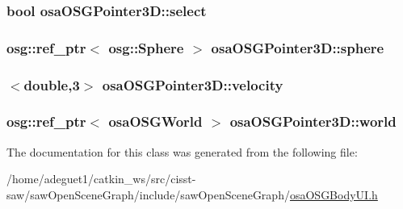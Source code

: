 \hypertarget{classosa_o_s_g_pointer3_d_acd02af84dcccbf5bb89fda754600414d}{
\subsubsection[{select}]{\setlength{\rightskip}{0pt plus 5cm}bool osa\-O\-S\-G\-Pointer3\-D\-::select\hspace{0.3cm}{\ttfamily [protected]}}}\label{classosa_o_s_g_pointer3_d_acd02af84dcccbf5bb89fda754600414d}
\hypertarget{classosa_o_s_g_pointer3_d_a3f2f4ea0fac395d6b6a8cb20af610d9d}{
\subsubsection[{sphere}]{\setlength{\rightskip}{0pt plus 5cm}osg\-::ref\-\_\-ptr$<$ osg\-::\-Sphere $>$ osa\-O\-S\-G\-Pointer3\-D\-::sphere\hspace{0.3cm}{\ttfamily [protected]}}}\label{classosa_o_s_g_pointer3_d_a3f2f4ea0fac395d6b6a8cb20af610d9d}
\hypertarget{classosa_o_s_g_pointer3_d_a9ed8936280696f8f7bd78bb1d20e7d81}{
\subsubsection[{velocity}]{$<$double,3$>$ osa\-O\-S\-G\-Pointer3\-D\-::velocity\hspace{0.3cm}{\ttfamily [protected]}}}\label{classosa_o_s_g_pointer3_d_a9ed8936280696f8f7bd78bb1d20e7d81}
\hypertarget{classosa_o_s_g_pointer3_d_a6576d36096a1c3a9127fbf9dbafee677}{
\subsubsection[{world}]{\setlength{\rightskip}{0pt plus 5cm}osg\-::ref\-\_\-ptr$<$ {\bf osa\-O\-S\-G\-World} $>$ osa\-O\-S\-G\-Pointer3\-D\-::world\hspace{0.3cm}{\ttfamily [protected]}}}\label{classosa_o_s_g_pointer3_d_a6576d36096a1c3a9127fbf9dbafee677}


The documentation for this class was generated from the following file\-:\begin{DoxyCompactItemize}
\item 
/home/adeguet1/catkin\-\_\-ws/src/cisst-\/saw/saw\-Open\-Scene\-Graph/include/saw\-Open\-Scene\-Graph/\hyperlink{osa_o_s_g_body_u_i_8h}{osa\-O\-S\-G\-Body\-U\-I.\-h}\end{DoxyCompactItemize}
